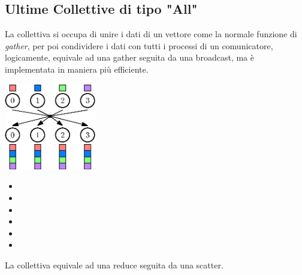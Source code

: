 \documentclass[10pt, letterpaper]{report}
\begin{document}
\subsection{Ultime Collettive di tipo "All"}
La collettiva  si occupa di 
unire i dati di un vettore come la normale funzione di 
\textit{gather}, per poi condividere i dati con tutti i 
processi di un comunicatore, logicamente, equivale ad una 
gather seguita da una broadcast, ma è implementata in 
maniera più efficiente.
\begin{center}
    \includegraphics[width=0.3\textwidth]{images/allgather.eps}
\end{center}\begin{itemize}
    \item     {}
    \item     {}
    \item     {}
    \item     {}
    \item     {}
    \item     {}
\end{itemize}
La collettiva  equivale ad una 
reduce seguita da una scatter.
\end{document}
